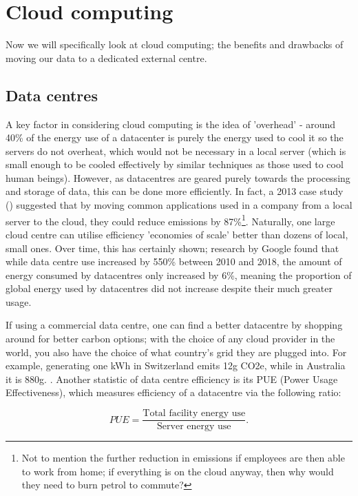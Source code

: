 \documentclass{article}
\begin{document}
\section{Cloud computing}
Now we will specifically look at cloud computing; the benefits and drawbacks of moving our data to a dedicated external centre.


\subsection{Data centres}
A key factor in considering cloud computing is the idea of 'overhead' - around 40\% of the energy use of a datacenter is purely the energy used to cool it so the servers do not overheat,  \citep{lannelongue2021ten} which would not be necessary in a local server (which is small enough to be cooled effectively by similar techniques as those used to cool human beings). However, as datacentres are geared purely towards the processing and storage of data, this can be done more efficiently. In fact, a 2013 case study (\citet{masanet2013energy}) suggested that by moving common applications used in a company from a local server to the cloud, they could reduce emissions by 87\%\footnote{Not to mention the further reduction in emissions if employees are then able to work from home; if everything is on the cloud anyway, then why would they need to burn petrol to commute?}. Naturally, one large cloud centre can utilise efficiency 'economies of scale' better than dozens of local, small ones. Over time, this has certainly shown; research by Google found that while data centre use increased by 550\% between 2010 and 2018, the amount of energy consumed by datacentres only increased by 6\%, meaning the proportion of global energy used by datacentres did not increase despite their much greater usage. \citep{masanet2020recalibrating}\newline

If using a commercial data centre, one can find a better datacentre by shopping around for better carbon options; with the choice of any cloud provider in the world, you also have the choice of what country's grid they are plugged into. For example, generating one kWh in Switzerland emits 12g CO2e, while in Australia it is 880g. \citep{grealey2021carbon}. Another statistic of data centre efficiency is its PUE (Power Usage Effectiveness), which measures efficiency of a datacentre via the following ratio:

$$PUE = \frac{\textrm{Total facility energy use}}{\textrm{Server energy use}}.$$
\end{document}
